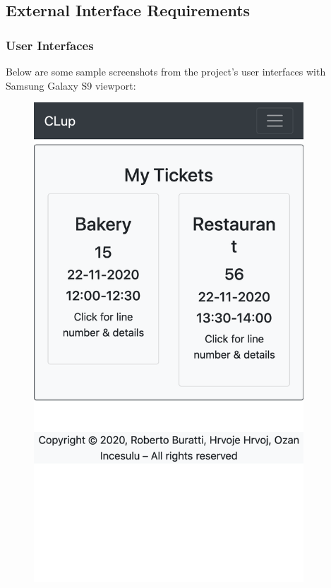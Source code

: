 
\subsection{External Interface Requirements}

\subsubsection{User Interfaces}


Below are some sample screenshots from the project's user interfaces with Samsung Galaxy S9 viewport: \\
\begin{figure}[H]
    \centering
    \begin{minipage}{0.45\textwidth}
        \centering
        \includegraphics[width=0.9\textwidth]{Images/Screenshots/ticketList.png}

\end{minipage}
\end{figure}

